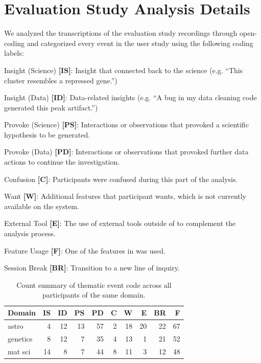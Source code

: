  \section{Evaluation Study Analysis Details\label{apdx:studydetails}}
 We analyzed the transcriptions of the evaluation study recordings through open-coding and
 categorized every event in the user study using the following coding labels:
 \begin{denselist}
     \item Insight (Science) \textbf{[IS]}: Insight that connected back to the science (e.g. ``This cluster resembles a repressed gene.'')
     \item Insight (Data) \textbf{[ID]}: Data-related insights (e.g. ``A bug in my data cleaning code generated this peak artifact.'')
     \item Provoke (Science) \textbf{[PS]}: Interactions or observations that provoked a scientific hypothesis to be generated.
     \item Provoke (Data) \textbf{[PD]}: Interactions or observations that provoked further data actions to continue the investigation.
     \item Confusion \textbf{[C]}: Participants were confused during this part of the analysis.
     \item Want \textbf{[W]}: Additional features that participant wants, which is not currently available on the system.
     \item External Tool \textbf{[E]}: The use of external tools outside of \zvpp to complement the analysis process.
     \item Feature Usage \textbf{[F]}: One of the features in \zvpp was used.
     \item Session Break \textbf{[BR]}: Transition to a new line of inquiry.
 \end{denselist}
 \begin{table}[h!]
 \captionsetup{font=normalsize,labelfont=normalsize}
  \centering
   \begin{tabular}{lrrrrrrrrr}
   \hline
    Domain           &   IS &   ID &   PS &   PD &   C &   W &   E &   BR &   F \\
   \hline
    astro            &    4 &   12 &   13 &   57 &   2 &  18 &  20 &   22 &  67 \\
    genetics         &    8 &   12 &    7 &   35 &   4 &  13 &   1 &   21 &  52 \\
    mat sci          &   14 &    8 &    7 &   44 &   8 &  11 &   3 &   12 &  48 \\
   \hline
   \end{tabular}
   \caption{Count summary of thematic event code across all participants of the same domain.}
 \end{table}
